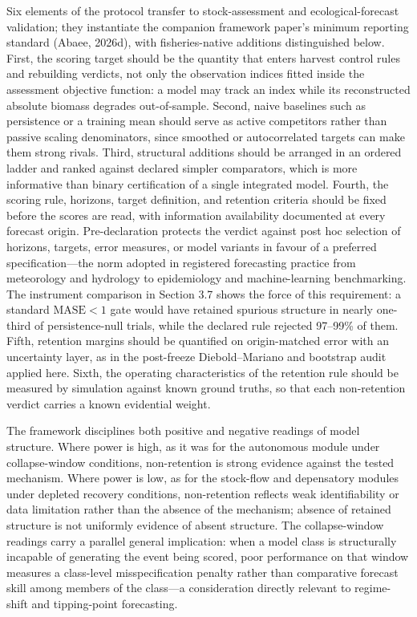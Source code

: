 \documentclass[11pt]{article}
\begin{document}
Six elements of the protocol transfer to stock-assessment and
ecological-forecast validation; they instantiate the companion framework
paper's minimum reporting standard (Abaee, 2026d), with fisheries-native
additions distinguished below. First, the scoring target should be the
quantity that enters harvest control rules and rebuilding verdicts, not
only the observation indices fitted inside the assessment objective
function: a model may track an index while its reconstructed absolute
biomass degrades out-of-sample. Second, naive baselines such as
persistence or a training mean should serve as active competitors rather
than passive scaling denominators, since smoothed or autocorrelated
targets can make them strong rivals. Third, structural additions should
be arranged in an ordered ladder and ranked against declared simpler
comparators, which is more informative than binary certification of a
single integrated model. Fourth, the scoring rule, horizons, target
definition, and retention criteria should be fixed before the scores are
read, with information availability documented at every forecast origin.
Pre-declaration protects the verdict against post hoc selection of
horizons, targets, error measures, or model variants in favour of a
preferred specification---the norm adopted in registered forecasting
practice from meteorology and hydrology to epidemiology and
machine-learning benchmarking. The instrument comparison in Section 3.7
shows the force of this requirement: a standard \(\mathrm{MASE} < 1\)
gate would have retained spurious structure in nearly one-third of
persistence-null trials, while the declared rule rejected 97--99\% of
them. Fifth, retention margins should be quantified on origin-matched
error with an uncertainty layer, as in the post-freeze Diebold--Mariano
and bootstrap audit applied here. Sixth, the operating characteristics
of the retention rule should be measured by simulation against known
ground truths, so that each non-retention verdict carries a known
evidential weight.

The framework disciplines both positive and negative readings of model
structure. Where power is high, as it was for the autonomous module
under collapse-window conditions, non-retention is strong evidence
against the tested mechanism. Where power is low, as for the stock-flow
and depensatory modules under depleted recovery conditions,
non-retention reflects weak identifiability or data limitation rather
than the absence of the mechanism; absence of retained structure is not
uniformly evidence of absent structure. The collapse-window readings
carry a parallel general implication: when a model class is structurally
incapable of generating the event being scored, poor performance on that
window measures a class-level misspecification penalty rather than
comparative forecast skill among members of the class---a consideration
directly relevant to regime-shift and tipping-point forecasting.
\end{document}
